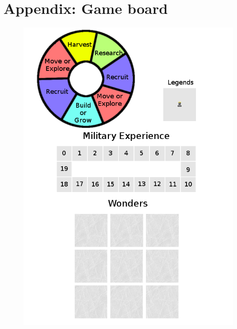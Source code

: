 \documentclass[11pt,a4paper,titlepage]{article}
\begin{document}
\section{Appendix: Game board}{
  \begin{figure}[!htb]
    \includegraphics[scale=.6]{doe_central_board.png}
    \captionsetup{labelformat=empty}
    \caption{}
    \label{fig:game_board}
  \end{figure}
}\label{sec:game_board}

\newpage
\end{document}
